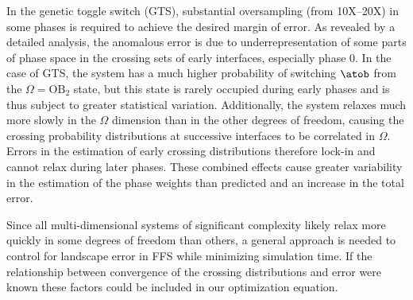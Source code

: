 In the genetic toggle switch (GTS), substantial oversampling (from 10X--20X) in some phases is required to achieve the desired margin of error. As revealed by a detailed analysis, the anomalous error is due to underrepresentation of some parts of phase space in the crossing sets of early interfaces, especially phase 0. In the case of GTS, the system has a much higher probability of switching $\atob$ from the $\Omega = \mathrm{OB_2}$ state, but this state is rarely occupied during early phases and is thus subject to greater statistical variation. Additionally, the system relaxes much more slowly in the $\Omega$ dimension than in the other degrees of freedom, causing the crossing probability distributions at successive interfaces to be correlated in $\Omega$. Errors in the estimation of early crossing distributions therefore lock-in and cannot relax during later phases. These combined effects cause greater variability in the estimation of the phase weights than predicted and an increase in the total error.


Since all multi-dimensional systems of significant complexity likely relax more quickly in some degrees of freedom than others, a general approach is needed to control for landscape error in FFS while minimizing simulation time. If the relationship between convergence of the crossing distributions and error were known these factors could be included in our optimization equation. 



